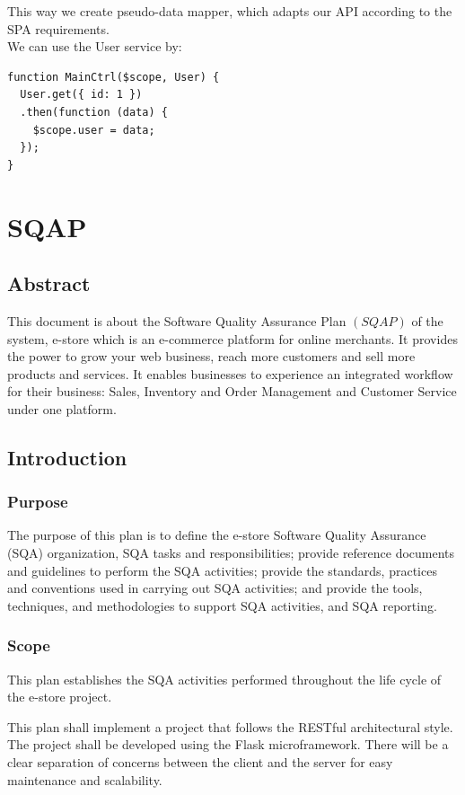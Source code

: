 \documentclass{report}
\begin{document}
This way we create pseudo-data mapper, which adapts our API according to the SPA requirements. \\
We can use the User service by:
\begin{lstlisting}
function MainCtrl($scope, User) {
  User.get({ id: 1 })
  .then(function (data) {
    $scope.user = data;
  });
}
\end{lstlisting}

\chapter{SQAP}
\label{chap:SQAP}
\section{Abstract}
This document is about the Software Quality Assurance Plan $(SQAP)$ of the system, e-store which is an e-commerce platform for online merchants. It provides the power to grow your web business, reach more customers and sell more products and services. It enables businesses to experience an integrated workflow for their business: Sales, Inventory and Order Management and Customer Service under one platform.
\section{Introduction}
\subsection{Purpose}
The purpose of this plan is to define the e-store Software Quality Assurance (SQA) organization, SQA tasks and responsibilities; provide reference documents and guidelines to perform the SQA activities; provide the standards, practices and conventions used in carrying out SQA activities; and provide the tools, techniques, and methodologies to support SQA activities, and SQA reporting.
	
\subsection{Scope}
This plan establishes the SQA activities performed throughout the life cycle of the e-store project.

This plan shall implement a project that follows the RESTful architectural style. The project shall be developed using the Flask microframework. There will be a clear separation of concerns between the client and the server for easy maintenance and scalability.
\end{document}

